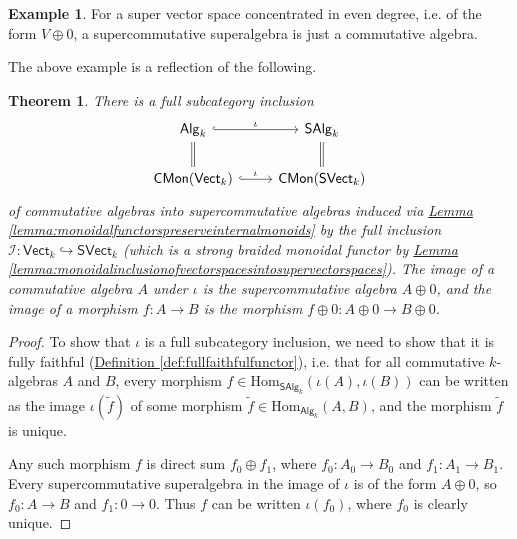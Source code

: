 \documentclass[a4paper,10pt]{scrreprt}
\newcommand{\Hom}{\mathrm{Hom}}
\theoremstyle{definition}
\newtheorem{example}{Example}[section]
\theoremstyle{plain}
\newtheorem{theorem}{Theorem}[section]
\theoremstyle{remark}
\begin{document}
\begin{example}
  For a super vector space concentrated in even degree, i.e. of the form $V \oplus 0$, a supercommutative superalgebra is just a commutative algebra.
\end{example}

The above example is a reflection of the following.

\begin{theorem}
  There is a full subcategory inclusion
  \begin{equation*}
    \begin{tikzcd}
      \mathsf{Alg}_{k}
      \arrow[d, equals]
      \arrow[r, "\iota", hookrightarrow]
      & \mathsf{SAlg}_{k}
      \arrow[d, equals]
      \\
      \mathsf{CMon}(\mathsf{Vect}_{k}) 
      \arrow[r, "\iota", hookrightarrow]
      & \mathsf{CMon}(\mathsf{SVect}_{k})
    \end{tikzcd}
  \end{equation*}
  of commutative algebras into supercommutative algebras induced via \hyperref[lemma:monoidalfunctorspreserveinternalmonoids]{Lemma \ref*{lemma:monoidalfunctorspreserveinternalmonoids}} by the full inclusion $\mathcal{I}\colon \mathsf{Vect}_{k} \hookrightarrow \mathsf{SVect}_{k}$ (which is a strong braided monoidal functor by \hyperref[lemma:monoidalinclusionofvectorspacesintosupervectorspaces]{Lemma \ref*{lemma:monoidalinclusionofvectorspacesintosupervectorspaces}}). The image of a commutative algebra $A$ under $\iota$ is the supercommutative algebra $A \oplus 0$, and the image of a morphism $f\colon A \to B$ is the morphism $f \oplus 0\colon A \oplus 0 \to B \oplus 0$.
\end{theorem}
\begin{proof}
  To show that $\iota$ is a full subcategory inclusion, we need to show that it is fully faithful (\hyperref[def:fullfaithfulfunctor]{Definition \ref*{def:fullfaithfulfunctor}}), i.e. that for all commutative $k$-algebras $A$ and $B$, every morphism $f\in \Hom_{\mathsf{SAlg}_{k}}(\iota(A), \iota(B))$ can be written as the image $\iota(\tilde{f})$ of some morphism $\tilde{f} \in \Hom_{\mathsf{Alg}_{k}}(A, B)$, and the morphism $\tilde{f}$ is unique.

  Any such morphism $f$ is direct sum $f_{0} \oplus f_{1}$, where $f_{0}\colon A_{0} \to B_{0}$ and $f_{1}\colon A_{1} \to B_{1}$. Every supercommutative superalgebra in the image of $\iota$ is of the form $A \oplus 0$, so $f_{0}\colon A \to B$ and $f_{1}\colon 0 \to 0$. Thus $f$ can be written $\iota(f_{0})$, where $f_{0}$ is clearly unique.
\end{proof}
\end{document}
